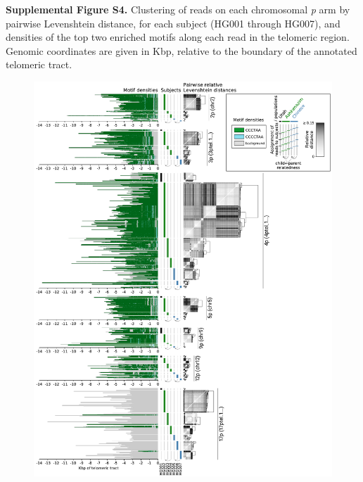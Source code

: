 \documentclass{article}
\begin{document}
\begin{samepage}

\noindent \textbf{Supplemental Figure S4.}
Clustering of reads on each chromosomal \textit{p} arm by pairwise Levenshtein distance, for each subject (HG001 through HG007), and densities of the top two enriched motifs along each read in the telomeric region.
Genomic coordinates are given in Kbp, relative to the boundary of the annotated telomeric tract.

\begin{figure}[h!] \centering
\includegraphics[width=\textwidth,keepaspectratio]{Figure_S4-nolegend.pdf}
\end{figure}

\end{samepage}
\end{document}
